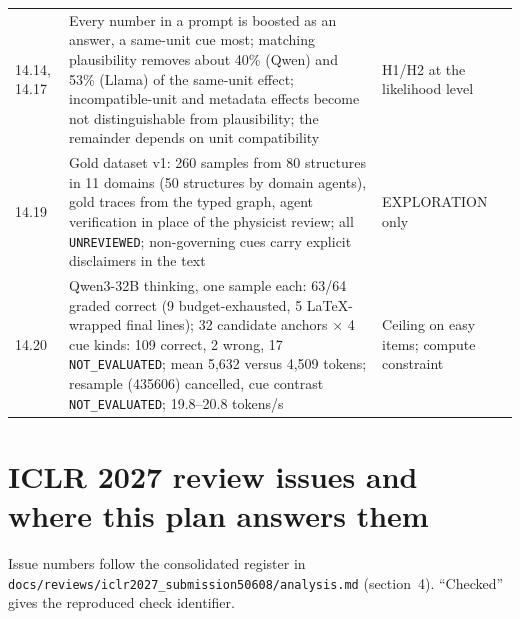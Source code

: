 \documentclass[10pt,a4paper]{article}
\newcommand{\NE}{\texttt{NOT\_EVALUATED}}
\begin{document}
\begin{center}
\begin{longtable}{@{}P{1.5cm}P{8.8cm}P{5.5cm}@{}}
14.14, 14.17 & Every number in a prompt is boosted as an answer, a same-unit cue most; matching plausibility removes about 40\% (Qwen) and 53\% (Llama) of the same-unit effect; incompatible-unit and metadata effects become not distinguishable from plausibility; the remainder depends on unit compatibility & H1/H2 at the likelihood level \\
14.19 & Gold dataset v1: 260 samples from 80 structures in 11 domains (50 structures by domain agents), gold traces from the typed graph, agent verification in place of the physicist review; all \texttt{UNREVIEWED}; non-governing cues carry explicit disclaimers in the text & EXPLORATION only \\
14.20 & Qwen3-32B thinking, one sample each: 63/64 graded correct (9 budget-exhausted, 5 LaTeX-wrapped final lines); 32 candidate anchors $\times$ 4 cue kinds: 109 correct, 2 wrong, 17 \NE{}; mean 5,632 versus 4,509 tokens; resample (435606) cancelled, cue contrast \NE{}; 19.8--20.8 tokens/s & Ceiling on easy items; compute constraint \\
\bottomrule
\end{longtable}
\end{center}

\section{ICLR 2027 review issues and where this plan answers them}
\label{app:reviews}

Issue numbers follow the consolidated register in \texttt{docs/reviews/iclr2027\_submission50608/analysis.md}
(section~4). ``Checked'' gives the reproduced check identifier.
\end{document}

